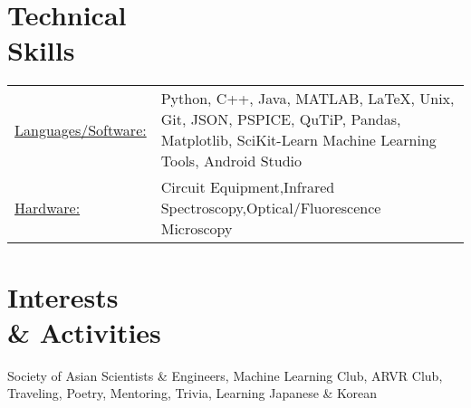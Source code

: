 \documentclass[margin]{res}
\begin{document}
\begin{resume}
\section{Technical \\ Skills}
   \begin{tabular}{l p{4.5in}}
    \underline{Languages/Software:} & Python, C++, Java, MATLAB, LaTeX, Unix, Git, JSON, PSPICE, QuTiP, Pandas, Matplotlib,  SciKit-Learn Machine Learning Tools, Android Studio \\
     \underline{Hardware:} & Circuit Equipment,Infrared Spectroscopy,Optical/Fluorescence Microscopy \\
 \end{tabular}
 
\section{Interests \\ \& Activities}
Society of Asian Scientists \& Engineers, Machine Learning Club, ARVR Club, Traveling, Poetry, Mentoring, Trivia, Learning Japanese \& Korean
\end{resume} 
\end{document}

